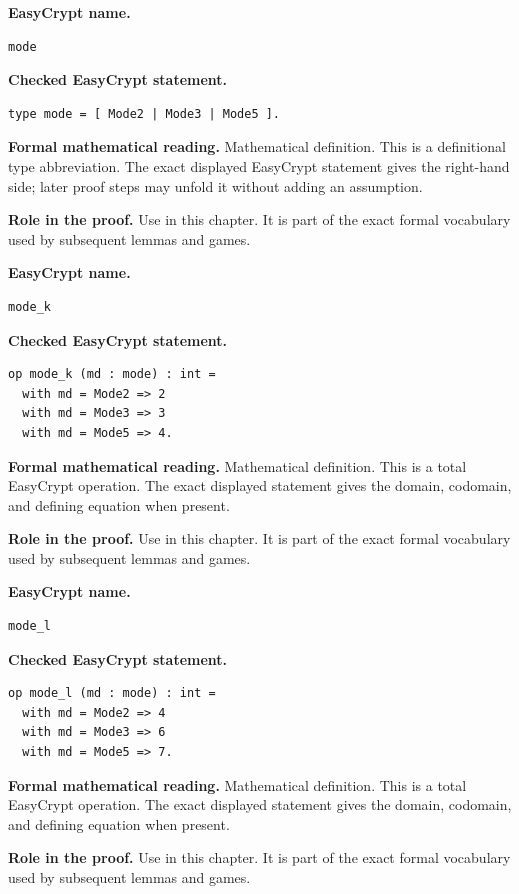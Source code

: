 \begin{formaldefinition}
\noindent\textbf{EasyCrypt name.}
\begin{lstlisting}[language=EasyCrypt,basicstyle=\ttfamily\scriptsize]
mode
\end{lstlisting}
\noindent\textbf{Checked EasyCrypt statement.}
\begin{lstlisting}[language=EasyCrypt,basicstyle=\ttfamily\scriptsize]
type mode = [ Mode2 | Mode3 | Mode5 ].
\end{lstlisting}
\noindent\textbf{Formal mathematical reading.}
Mathematical definition. This is a definitional type abbreviation.  The exact displayed EasyCrypt statement gives the right-hand side; later proof steps may unfold it without adding an assumption.

\noindent\textbf{Role in the proof.}
Use in this chapter. It is part of the exact formal vocabulary used by subsequent lemmas and games.

\end{formaldefinition}

\begin{formaldefinition}
\noindent\textbf{EasyCrypt name.}
\begin{lstlisting}[language=EasyCrypt,basicstyle=\ttfamily\scriptsize]
mode_k
\end{lstlisting}
\noindent\textbf{Checked EasyCrypt statement.}
\begin{lstlisting}[language=EasyCrypt,basicstyle=\ttfamily\scriptsize]
op mode_k (md : mode) : int =
  with md = Mode2 => 2
  with md = Mode3 => 3
  with md = Mode5 => 4.
\end{lstlisting}
\noindent\textbf{Formal mathematical reading.}
Mathematical definition. This is a total EasyCrypt operation.  The exact displayed statement gives the domain, codomain, and defining equation when present.

\noindent\textbf{Role in the proof.}
Use in this chapter. It is part of the exact formal vocabulary used by subsequent lemmas and games.

\end{formaldefinition}

\begin{formaldefinition}
\noindent\textbf{EasyCrypt name.}
\begin{lstlisting}[language=EasyCrypt,basicstyle=\ttfamily\scriptsize]
mode_l
\end{lstlisting}
\noindent\textbf{Checked EasyCrypt statement.}
\begin{lstlisting}[language=EasyCrypt,basicstyle=\ttfamily\scriptsize]
op mode_l (md : mode) : int =
  with md = Mode2 => 4
  with md = Mode3 => 6
  with md = Mode5 => 7.
\end{lstlisting}
\noindent\textbf{Formal mathematical reading.}
Mathematical definition. This is a total EasyCrypt operation.  The exact displayed statement gives the domain, codomain, and defining equation when present.

\noindent\textbf{Role in the proof.}
Use in this chapter. It is part of the exact formal vocabulary used by subsequent lemmas and games.

\end{formaldefinition}

